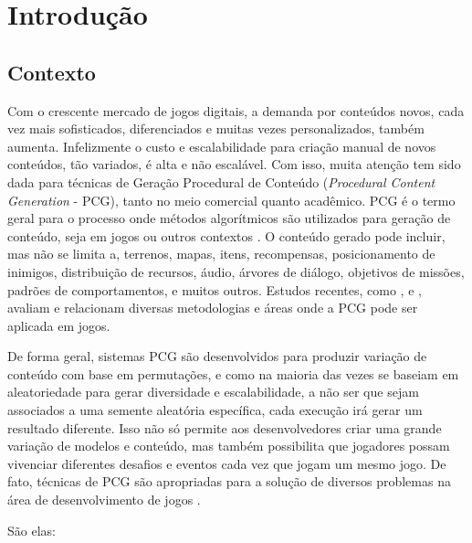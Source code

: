 \chapter{Introdução}
\label{introducao}

\section{Contexto}

Com o crescente mercado de jogos digitais, a demanda por conteúdos novos, cada vez mais sofisticados, diferenciados e muitas vezes personalizados, também aumenta. Infelizmente o custo e escalabilidade para criação manual de novos conteúdos, tão variados, é alta e não escalável. Com isso, muita atenção tem sido dada para técnicas de Geração Procedural de Conteúdo (\emph{Procedural Content Generation} - PCG), tanto no meio comercial quanto acadêmico. PCG é o termo geral para o processo onde métodos algorítmicos são utilizados para geração de conteúdo, seja em jogos ou outros contextos \cite{angelides2014procedural}. O conteúdo gerado pode incluir, mas não se limita a, terrenos, mapas, itens, recompensas, posicionamento de inimigos, distribuição de recursos, áudio, árvores de diálogo, objetivos de missões, padrões de comportamentos, e muitos outros. Estudos recentes, como \cite{hendrikx2013procedural}, \cite{togelius2011search} e \cite{yannakakis2011experience}, avaliam e relacionam diversas metodologias e áreas onde a PCG pode ser aplicada em jogos.

De forma geral, sistemas PCG são desenvolvidos para produzir variação de conteúdo com base em permutações, e como na maioria das vezes se baseiam em aleatoriedade para gerar diversidade e escalabilidade, a não ser que sejam associados a uma semente aleatória específica, cada execução irá gerar um resultado diferente. Isso não só permite aos desenvolvedores criar uma grande variação de modelos e conteúdo, mas também possibilita que jogadores possam vivenciar diferentes desafios e eventos cada vez que jogam um mesmo jogo. De fato, técnicas de PCG são apropriadas para a solução de diversos problemas na área de desenvolvimento de jogos \cite{angelides2014procedural}.

São elas:


